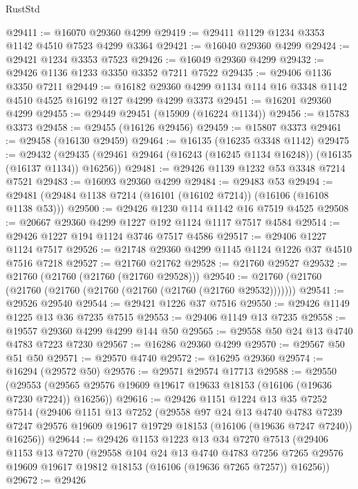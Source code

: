\begin{lexlean}{RustStd}
\begin{coremodule}
@29411 := @16070 @29360 @4299
@29419 := @29411 @1129 @1234 @3353 @1142 @4510 @7523 @4299 @3364
@29421 := @16040 @29360 @4299
@29424 := @29421 @1234 @3353 @7523
@29426 := @16049 @29360 @4299
@29432 := @29426 @1136 @1233 @3350 @3352 @7211 @7522
@29435 := @29406 @1136 @3350 @7211
@29449 := @16182 @29360 @4299 @1134 @114 @16 @3348 @1142 @4510 @4525 @16192 @127 @4299 @4299 @3373
@29451 := @16201 @29360 @4299
@29455 := @29449 @29451 (@15909 (@16224 @1134))
@29456 := @15783 @3373
@29458 := @29455 (@16126 @29456)
@29459 := @15807 @3373
@29461 := @29458 (@16130 @29459)
@29464 := @16135 (@16235 @3348 @1142)
@29475 := @29432
    (@29435 (@29461 @29464 (@16243 (@16245 @1134 @16248)) (@16135 (@16137 @1134)) @16256))
@29481 := @29426 @1139 @1232 @53 @3348 @7214 @7521
@29483 := @16093 @29360 @4299
@29484 := @29483 @53
@29494 := @29481 (@29484 @1138 @7214 (@16101 (@16102 @7214)) (@16106 (@16108 @1138 @53)))
@29500 := @29426 @1230 @114 @1142 @16 @7519 @4525
@29508 := @20667 @29360 @4299 @1227 @192 @1124 @1117 @7517 @4584
@29514 := @29426 @1227 @194 @1124 @3746 @7517 @4586
@29517 := @29406 @1227 @1124 @7517
@29526 := @21748 @29360 @4299 @1145 @1124 @1226 @37 @4510 @7516 @7218
@29527 := @21760 @21762
@29528 := @21760 @29527
@29532 := @21760 (@21760 (@21760 (@21760 @29528)))
@29540 := @21760 (@21760 (@21760 (@21760 (@21760 (@21760 (@21760 (@21760 @29532)))))))
@29541 := @29526 @29540
@29544 := @29421 @1226 @37 @7516
@29550 := @29426 @1149 @1225 @13 @36 @7235 @7515
@29553 := @29406 @1149 @13 @7235
@29558 := @19557 @29360 @4299 @4299 @144 @50
@29565 := @29558 @50 @24 @13 @4740 @4783 @7223 @7230
@29567 := @16286 @29360 @4299
@29570 := @29567 @50 @51 @50
@29571 := @29570 @4740
@29572 := @16295 @29360
@29574 := @16294 (@29572 @50)
@29576 := @29571 @29574 @17713
@29588 := @29550
    (@29553 (@29565 @29576 @19609 @19617 @19633 @18153 (@16106 (@19636 @7230 @7224)) @16256))
@29616 := @29426
    @1151
    @1224
    @13
    @35
    @7252
    @7514
    (@29406
      @1151
      @13
      @7252
      (@29558
        @97
        @24
        @13
        @4740
        @4783
        @7239
        @7247
        @29576
        @19609
        @19617
        @19729
        @18153
        (@16106 (@19636 @7247 @7240))
        @16256))
@29644 := @29426
    @1153
    @1223
    @13
    @34
    @7270
    @7513
    (@29406
      @1153
      @13
      @7270
      (@29558
        @104
        @24
        @13
        @4740
        @4783
        @7256
        @7265
        @29576
        @19609
        @19617
        @19812
        @18153
        (@16106 (@19636 @7265 @7257))
        @16256))
@29672 := @29426

\end{coremodule}
\end{lexlean}
